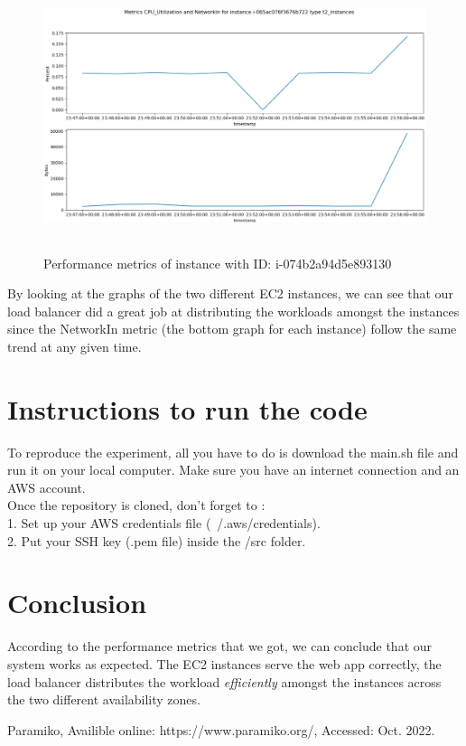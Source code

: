 \documentclass[12pt]{article}
\begin{document}
\begin{figure}[htbp]
\centering
  \includegraphics[height=300px]{Capture2.png}
  \caption{Performance metrics of instance with ID: i-074b2a94d5e893130}
\end{figure}

By looking at the graphs of the two different EC2 instances, we can see that our load balancer did a great job at distributing the workloads amongst the instances since the NetworkIn metric (the bottom graph for each instance) follow the same trend at any given time.

\section{Instructions to run the code}

To reproduce the experiment, all you have to do is download the main.sh file and run it on your local computer. Make sure you have an internet connection and an AWS account. \\
Once the repository is cloned, don't forget to : \\
1. Set up your AWS credentials file (~/.aws/credentials). \\
2. Put your SSH key (.pem file) inside the /src folder.

\section{Conclusion}

According to the performance metrics that we got, we can conclude that our system works as expected. The EC2 instances serve the web app correctly, the load balancer distributes the workload \emph{efficiently} amongst the instances across the two different availability zones.

\begin{thebibliography}{9}
Paramiko, Availible online: https://www.paramiko.org/, Accessed: Oct. 2022. 
\end{thebibliography}
\end{document}
